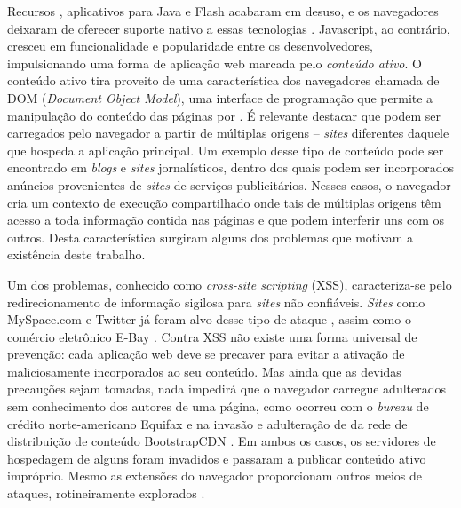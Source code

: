 Recursos , aplicativos para Java e Flash acabaram em desuso, e os navegadores deixaram de oferecer suporte nativo a essas tecnologias \cite{Verge2016, Adobe2017}. Javascript, ao contrário, cresceu em funcionalidade e popularidade entre os desenvolvedores, impulsionando uma forma de aplicação web marcada pelo \textit{conteúdo ativo}. O conteúdo ativo tira proveito de uma característica dos navegadores chamada de DOM (\textit{Document Object Model}), uma interface de programação que permite a manipulação do conteúdo das páginas por {\scripts}. É relevante destacar que \scripts{} podem ser carregados pelo navegador a partir de múltiplas origens -- \textit{sites} diferentes daquele que hospeda a aplicação principal. Um exemplo desse tipo de conteúdo pode ser encontrado em \textit{blogs} e \textit{sites} jornalísticos, dentro dos quais podem ser incorporados anúncios provenientes de \textit{sites} de serviços publicitários. Nesses casos, o navegador cria um contexto de execução compartilhado onde tais {\scripts} de múltiplas origens têm acesso a toda informação contida nas páginas e que podem interferir uns com os outros. Desta característica surgiram alguns dos problemas que motivam a existência deste trabalho.

Um dos problemas, conhecido como \textit{cross-site scripting} (XSS), caracteriza-se pelo redirecionamento de informação sigilosa para \textit{sites} não confiáveis. \textit{Sites} como MySpace.com e Twitter já foram alvo desse tipo de ataque \cite{IBM2017}, assim como o comércio eletrônico E-Bay \cite{Vanunu2016}. Contra XSS não existe uma forma universal de prevenção: cada aplicação web deve se precaver para evitar a ativação de {\scripts} maliciosamente incorporados ao seu conteúdo. Mas ainda que as devidas precauções sejam tomadas, nada impedirá que o navegador carregue {\scripts} adulterados sem conhecimento dos autores de uma página, como ocorreu com o \textit{bureau} de crédito norte-americano Equifax \cite{Segura2017} e na invasão e adulteração de {\scripts} da rede de distribuição de conteúdo BootstrapCDN \cite{Dorfman2013}. Em ambos os casos, os servidores de hospedagem de alguns {\scripts} foram invadidos e passaram a publicar conteúdo ativo impróprio. Mesmo as extensões do navegador proporcionam outros meios de ataques, rotineiramente explorados \cite{Forrest2017}.

